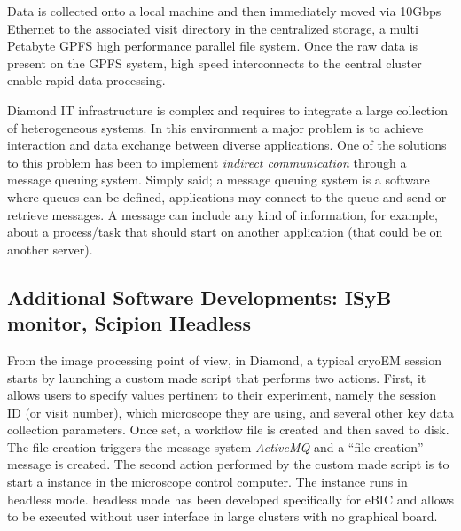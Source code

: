 Data is collected onto a local machine %
and then immediately moved via 10Gbps Ethernet to the associated visit directory in the centralized storage, a multi Petabyte GPFS high performance parallel file system.  Once the raw data is present on the GPFS system, high speed interconnects to the central cluster enable rapid data processing. %

Diamond IT infrastructure is complex and requires to integrate a large collection of heterogeneous systems. In this environment a major problem is to achieve interaction and data exchange between diverse applications. One of the solutions to this problem has been to implement \emph{indirect communication} through a message queuing system. Simply said; a message queuing system is a software where queues can be defined, applications may connect to the queue and send or retrieve  messages. A message can include any kind of information, for example, about a process/task that should start on another application (that could be on another server). %

\subsection{Additional Software Developments: ISyB monitor, Scipion Headless}

From the image processing point of view, in Diamond, a typical cryoEM session starts by launching a custom made script that performs two actions. First, it  allows users to specify values pertinent to their experiment, namely the session ID (or visit number), which microscope they are using, and several other key data collection parameters. Once set, a workflow file is created and then saved to disk.
The file creation triggers the message system \emph{ActiveMQ} and a ``file creation'' message is created. The second action performed by the custom made script is to start a \scipion instance in the microscope control computer.
The instance runs in headless mode. \scipion headless mode has been developed specifically for eBIC and allows \scipion to be executed without user interface in large clusters with no graphical board. 

